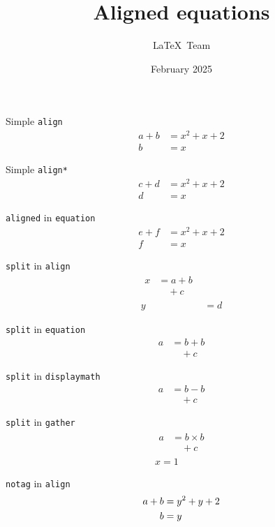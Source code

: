 \documentclass[a4paper]{article}
\title{Aligned equations}
\author{\LaTeX\ Team}
\date{February 2025}
\begin{document}
\maketitle



Simple \texttt{align}
\begin{align}
  a+b&=x^2+x+2\\
    b&=x
\end{align}



Simple \texttt{align*}
\begin{align*}
  c+d&=x^2+x+2\\
    d&=x
\end{align*}


\texttt{aligned} in \texttt{equation}
\begin{equation}
\begin{aligned}
  e+f&=x^2+x+2\\
    f&=x
\end{aligned}
\end{equation}

\texttt{split} in \texttt{align}
\begin{align}
\begin{split}
  x&= a  +  b\\
   &\quad + c
\end{split}\\
  y&=d
\end{align}

\texttt{split} in \texttt{equation}
\begin{equation}
\begin{split}
 a & = b+b\\
   &\quad + c
\end{split} 
\end{equation}

\texttt{split} in \texttt{displaymath}
\[
\begin{split}
 a & = b-b\\
   &\quad + c
\end{split} 
\]

\texttt{split} in \texttt{gather} 
\begin{gather}
\begin{split}
 a & = b\times b\\
   &\quad + c
\end{split}\\
x=1
\end{gather}


\texttt{notag} in  \texttt{align}
\begin{align}
  a+b&=y^2+y+2\notag\\
    b&=y
\end{align}
\end{document}
